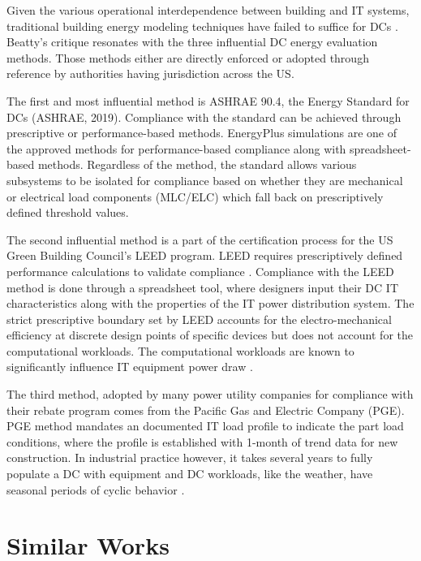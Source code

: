 {Given the various operational interdependence between building and IT systems, traditional building energy modeling techniques have failed to suffice for DCs \citep{Beatty15}. Beatty's critique resonates with the three influential DC energy evaluation methods. Those methods either are directly enforced or adopted through reference by authorities having jurisdiction across the US. 

The first and most influential method is ASHRAE 90.4, the Energy Standard for DCs (ASHRAE, 2019). Compliance with the standard can be achieved through prescriptive or performance-based methods. EnergyPlus simulations are one of the approved methods for performance-based compliance along with spreadsheet-based methods. Regardless of the method, the standard allows various subsystems to be isolated for compliance based on whether they are mechanical or electrical load components (MLC/ELC) which fall back on prescriptively defined threshold values.

The second influential method is a part of the certification process for the US Green Building Council's LEED program. LEED requires prescriptively defined performance calculations to validate compliance \citep{LEED16}. Compliance with the LEED method is done through a spreadsheet tool, where designers input their DC IT characteristics along with the properties of the IT power distribution system. The strict prescriptive boundary set by LEED accounts for the electro-mechanical efficiency at discrete design points of specific devices but does not account for the computational workloads. The computational workloads are known to significantly influence IT equipment power draw \citep{marculescu20}.  

The third method, adopted by many power utility companies for compliance with their rebate program comes from the Pacific Gas and Electric Company (PGE). PGE method mandates an documented IT load profile to indicate the part load conditions, where the profile is established with 1-month of trend data for new construction. In industrial practice however, it takes several years to fully populate a DC with equipment and DC workloads, like the weather, have seasonal periods of cyclic behavior \citep{zhuang15}.}

\section{Similar Works}

